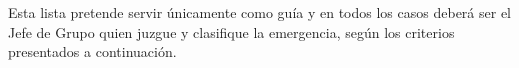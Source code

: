 
Esta lista pretende servir únicamente como guía y en todos los casos deberá ser el Jefe de Grupo quien juzgue y clasifique la emergencia, según los criterios presentados a continuación.
